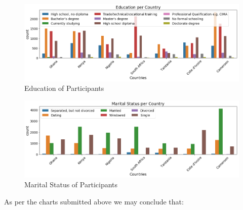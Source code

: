 \begin{Schunk}
\begin{figure}[H]

{\centering \includegraphics[width=1.15\linewidth]{../../artifacts/participant_education} 

}

\caption[Education of Participants]{Education of Participants}\label{fig:pe}
\end{figure}
\end{Schunk}

\begin{Schunk}
\begin{figure}[H]

{\centering \includegraphics[width=1.15\linewidth]{../../artifacts/participant_marital} 

}

\caption[Marital Status of Participants]{Marital Status of Participants}\label{fig:pms}
\end{figure}
\end{Schunk}

As per the charts submitted above we may conclude that:

